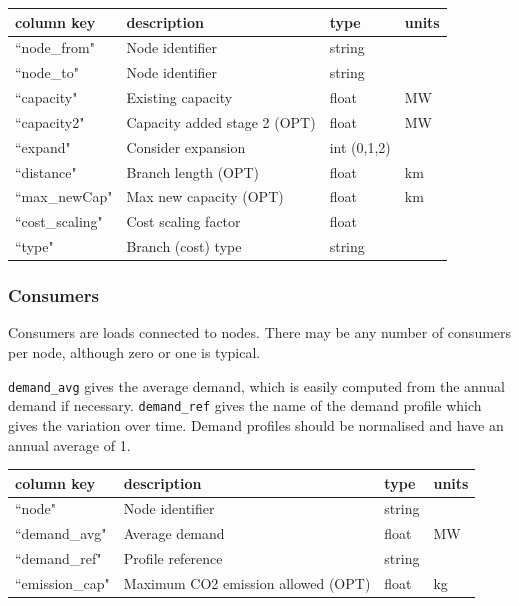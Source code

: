 \documentclass{article}
\begin{document}
\medskip
\begin{tabular}{llll}
	\hline
	column key & description & type & units \\
	\hline
	``node\_from"	&	Node identifier 	& string	& \\
	``node\_to"		&	Node identifier	& string	& \\
	``capacity"		&	Existing capacity & float		& MW \\
	``capacity2"		&	Capacity added stage 2 (OPT) & float		& MW \\
	``expand"			&	Consider expansion & int (0,1,2)		& \\
	``distance"		&	Branch length (OPT) & float		& km \\
	``max\_newCap"		&	Max new capacity (OPT) & float		& km \\
	``cost\_scaling"	&	Cost scaling factor & float	&  \\
	``type"			&	Branch (cost) type & string		&  \\

	\hline
\end{tabular}


\subsubsection{Consumers}
Consumers are loads connected to nodes. There may be any number of consumers per node, although zero or one is typical.

\texttt{demand\_avg} gives the average demand, which is easily computed from the annual demand if necessary.
\texttt{demand\_ref} gives the name of the demand profile which gives the variation over time. Demand profiles should be normalised and have an annual average of 1.

\medskip
\begin{tabular}{llll}
	\hline
	column key & description & type & units \\
	\hline
	``node"			& Node identifier 	& string		& \\
	``demand\_avg"		& Average demand	& float		& MW \\
	``demand\_ref"		& Profile reference	& string	&  \\
	``emission\_cap"		& Maximum CO2 emission allowed	(OPT) & float	&   kg\\	\hline
\end{tabular}
\end{document}
